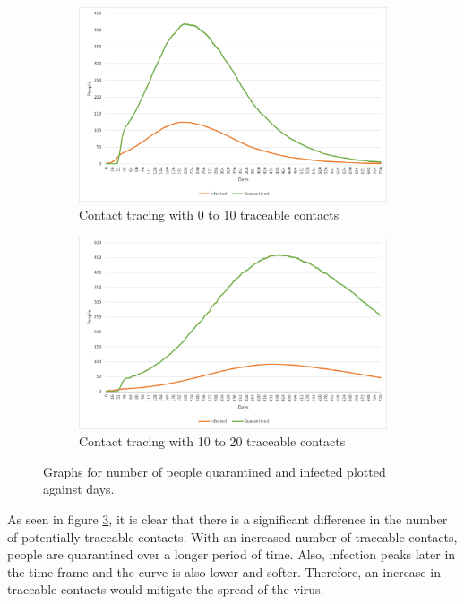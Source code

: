 \begin{figure}[H]
\centering
\begin{subfigure}{.5\textwidth}
  \centering
  \includegraphics[width=.95\linewidth]{0_billeder/CT-Trace-0-10.png}
  \caption{Contact tracing with 0 to 10 traceable contacts}
  \label{Subfig:CT15DH}
\end{subfigure}%
\begin{subfigure}{.5\textwidth}
  \centering
  \includegraphics[width=.95\linewidth]{0_billeder/CT-Trace-10-20.png}
  \caption{Contact tracing with 10 to 20 traceable contacts}
  \label{Subfig:CT60DH}
\end{subfigure}
\caption{Graphs for number of people quarantined and infected plotted against days.}
\label{fig:CTstart2}
\end{figure}

As seen in figure \ref{fig:CTstart2}, it is clear that there is a significant difference in the number of potentially traceable contacts. With an increased number of traceable contacts, people are quarantined over a longer period of time. Also, infection peaks later in the time frame and the curve is also lower and softer. Therefore, an increase in traceable contacts would mitigate the spread of the virus.